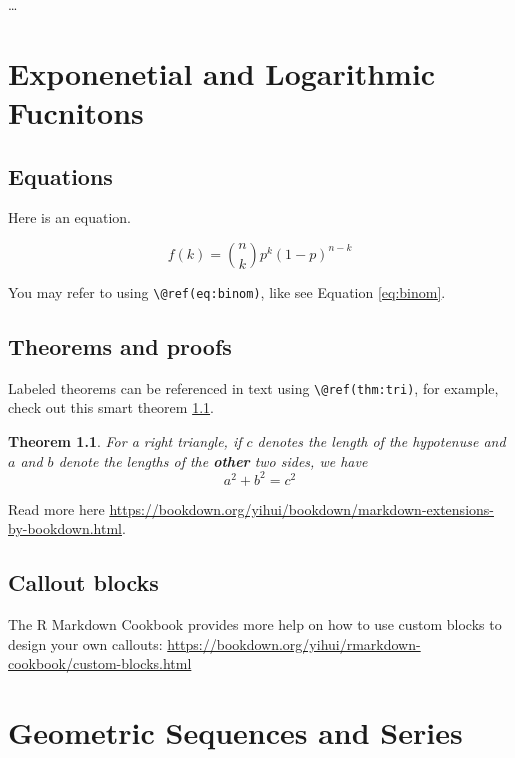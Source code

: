 \documentclass[
]{book}
\newtheorem{theorem}{Theorem}[chapter]
\theoremstyle{definition}
\theoremstyle{definition}
\theoremstyle{definition}
\theoremstyle{definition}
\theoremstyle{remark}
\begin{document}
\ldots{}

\hypertarget{exponenetial-and-logarithmic-fucnitons}{%
\chapter{Exponenetial and Logarithmic Fucnitons}\label{exponenetial-and-logarithmic-fucnitons}}

\hypertarget{equations}{%
\section{Equations}\label{equations}}

Here is an equation.

\begin{equation} 
  f\left(k\right) = \binom{n}{k} p^k\left(1-p\right)^{n-k}
  \label{eq:binom}
\end{equation}

You may refer to using \texttt{\textbackslash{}@ref(eq:binom)}, like see Equation \eqref{eq:binom}.

\hypertarget{theorems-and-proofs}{%
\section{Theorems and proofs}\label{theorems-and-proofs}}

Labeled theorems can be referenced in text using \texttt{\textbackslash{}@ref(thm:tri)}, for example, check out this smart theorem \ref{thm:tri}.

\begin{theorem}
\protect\hypertarget{thm:tri}{}\label{thm:tri}For a right triangle, if \(c\) denotes the \emph{length} of the hypotenuse
and \(a\) and \(b\) denote the lengths of the \textbf{other} two sides, we have
\[a^2 + b^2 = c^2\]
\end{theorem}

Read more here \url{https://bookdown.org/yihui/bookdown/markdown-extensions-by-bookdown.html}.

\hypertarget{callout-blocks}{%
\section{Callout blocks}\label{callout-blocks}}

The R Markdown Cookbook provides more help on how to use custom blocks to design your own callouts: \url{https://bookdown.org/yihui/rmarkdown-cookbook/custom-blocks.html}

\hypertarget{geometric-sequences-and-series}{%
\chapter{Geometric Sequences and Series}\label{geometric-sequences-and-series}}
\end{document}
